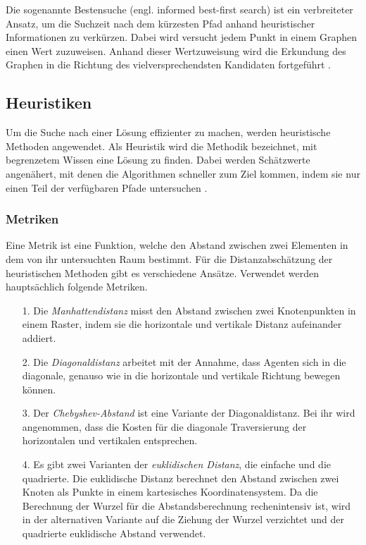 Die sogenannte Bestensuche (engl. informed best-first search)
ist ein verbreiteter Ansatz, um die Suchzeit nach dem kürzesten Pfad anhand heuristischer Informationen zu verkürzen. Dabei wird versucht jedem Punkt in einem Graphen einen Wert zuzuweisen. Anhand dieser Wertzuweisung wird die Erkundung des Graphen in die Richtung des vielversprechendsten Kandidaten fortgeführt \cite{RinaDechterandJudeaPearl.1983}.

\subsection{Heuristiken}
Um die Suche nach einer Lösung effizienter zu machen, werden heuristische Methoden angewendet. Als Heuristik wird die Methodik bezeichnet, mit begrenzetem Wissen eine Lösung zu finden. Dabei werden Schätzwerte angenähert, mit denen die Algorithmen schneller zum Ziel kommen, indem sie nur einen Teil der verfügbaren Pfade untersuchen \cite{RinaDechterandJudeaPearl.1983}.

\subsubsection{Metriken}
Eine Metrik ist eine Funktion, welche den Abstand zwischen zwei Elementen in dem von ihr untersuchten Raum bestimmt. Für die Distanzabschätzung der heuristischen Methoden gibt es verschiedene Ansätze. Verwendet werden hauptsächlich folgende Metriken.

\begin{itemize}
\item[1.] Die \textit{Manhattendistanz} misst den Abstand zwischen zwei Knotenpunkten in einem Raster, indem sie die horizontale und vertikale Distanz aufeinander addiert.

\item[2.] Die \textit{Diagonaldistanz} arbeitet mit der Annahme, dass Agenten sich in die diagonale, genauso wie in die horizontale und vertikale Richtung bewegen können.

\item[3.] Der \textit{Chebyshev-Abstand} ist eine Variante der Diagonaldistanz. Bei ihr wird angenommen, dass die Kosten für die diagonale Traversierung der horizontalen und vertikalen entsprechen.

\item[4.] Es gibt zwei Varianten der \textit{euklidischen Distanz}, die einfache und die quadrierte. Die euklidische Distanz berechnet den Abstand zwischen zwei Knoten als Punkte in einem kartesisches Koordinatensystem. Da die Berechnung der Wurzel für die Abstandsberechnung rechenintensiv ist, wird in der alternativen Variante auf die Ziehung der Wurzel verzichtet und der quadrierte euklidische Abstand verwendet\cite{You19}.

\end{itemize}
